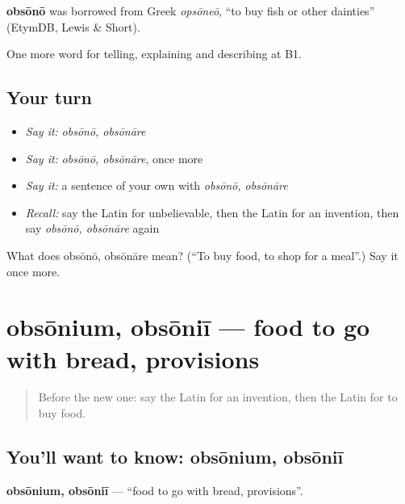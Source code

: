 \begin{cousinweb}
\textbf{obsōnō} was borrowed from Greek \emph{opsōneō}, \textquotedblleft{}to buy fish or other dainties\textquotedblright{} (EtymDB, Lewis \& Short).
\end{cousinweb}

\begin{grammarlens}[title={What you've built}]
One more word for telling, explaining and describing at B1.
\end{grammarlens}

\subsection*{Your turn}
\begin{itemize}
\raggedright
  \item \emph{Say it:} \emph{obsōnō, obsōnāre}
  \item \emph{Say it:} \emph{obsōnō, obsōnāre}, once more
  \item \emph{Say it:} a sentence of your own with \emph{obsōnō, obsōnāre}
  \item \emph{Recall:} say the Latin for unbelievable, then the Latin for an invention, then say \emph{obsōnō, obsōnāre} again
\end{itemize}

\begin{tcolorbox}[breakable,colback=teal!4,colframe=teal!35!black,title={Before you move on}]
What does obsōnō, obsōnāre mean? (\textquotedblleft{}To buy food, to shop for a meal\textquotedblright{}.) Say it once more.
\end{tcolorbox}
\section[obsōnium, obsōniī]{obsōnium, obsōniī — food to go with bread, provisions}

\label{lesson:LA-C350-obsonium}



\begin{quote}
Before the new one: say the Latin for an invention, then the Latin for to buy food.
\end{quote}

\subsection*{You'll want to know: obsōnium, obsōniī}
\textbf{obsōnium, obsōniī} — \textquotedblleft{}food to go with bread, provisions\textquotedblright{}.

